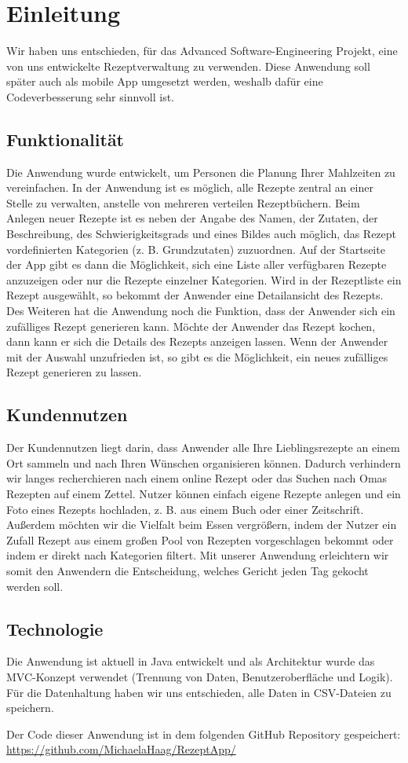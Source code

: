 \chapter{Einleitung}
Wir haben uns entschieden, für das Advanced Software-Engineering Projekt,
eine von uns entwickelte Rezeptverwaltung zu verwenden. Diese Anwendung
soll später auch als mobile App umgesetzt werden, weshalb dafür eine
Codeverbesserung sehr sinnvoll ist.
\section{Funktionalität}
Die Anwendung wurde entwickelt, um Personen die Planung Ihrer Mahlzeiten zu vereinfachen.
In der Anwendung ist es möglich, alle Rezepte zentral an einer Stelle zu verwalten, anstelle von
mehreren verteilen Rezeptbüchern. Beim Anlegen neuer Rezepte ist es neben der Angabe des
Namen, der Zutaten, der Beschreibung, des Schwierigkeitsgrads und eines Bildes auch möglich, das
Rezept vordefinierten Kategorien (z. B. Grundzutaten) zuzuordnen.
Auf der Startseite der App gibt es dann die Möglichkeit, sich eine Liste aller verfügbaren Rezepte
anzuzeigen oder nur die Rezepte einzelner Kategorien. Wird in der Rezeptliste ein Rezept
ausgewählt, so bekommt der Anwender eine Detailansicht des Rezepts.
Des Weiteren hat die Anwendung noch die Funktion, dass der Anwender sich ein zufälliges Rezept
generieren kann. Möchte der Anwender das Rezept kochen, dann kann er sich die Details des
Rezepts anzeigen lassen. Wenn der Anwender mit der Auswahl unzufrieden ist, so gibt es die
Möglichkeit, ein neues zufälliges Rezept generieren zu lassen.
\section{Kundennutzen}
Der Kundennutzen liegt darin, dass Anwender alle Ihre Lieblingsrezepte an einem Ort sammeln und
nach Ihren Wünschen organisieren können. Dadurch verhindern wir langes recherchieren nach
einem online Rezept oder das Suchen nach Omas Rezepten auf einem Zettel.
Nutzer können einfach eigene Rezepte anlegen und ein Foto eines Rezepts hochladen, z. B. aus
einem Buch oder einer Zeitschrift.
Außerdem möchten wir die Vielfalt beim Essen vergrößern, indem der Nutzer ein Zufall Rezept aus
einem großen Pool von Rezepten vorgeschlagen bekommt oder indem er direkt nach Kategorien
filtert.
Mit unserer Anwendung erleichtern wir somit den Anwendern die Entscheidung, welches Gericht
jeden Tag gekocht werden soll.
\section{Technologie}
Die Anwendung ist aktuell in Java entwickelt und als Architektur wurde das MVC-Konzept verwendet
(Trennung von Daten, Benutzeroberfläche und Logik).
Für die Datenhaltung haben wir uns entschieden, alle Daten in CSV-Dateien zu speichern. 

Der Code dieser Anwendung ist in dem folgenden GitHub Repository gespeichert: 
\href{https://github.com/MichaelaHaag/RezeptApp/}{https://github.com/MichaelaHaag/RezeptApp/}